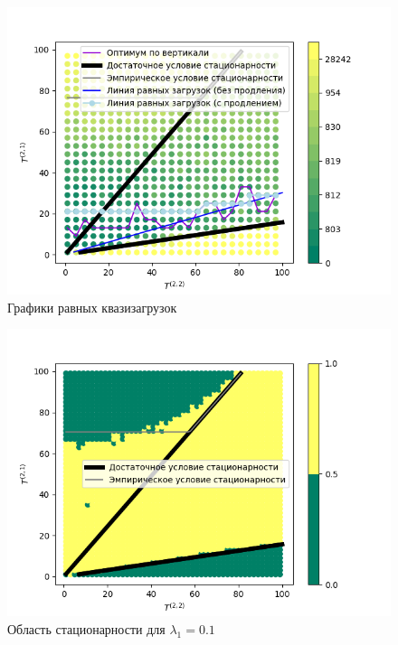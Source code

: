 \documentclass[11pt]{ubs}
\begin{document}
\begin{figure}[ht]
\centering
\includegraphics[scale=0.7]{0_1_thres_10_target.png} 
\caption{Графики равных квазизагрузок}
\label{Experiment:targets}
\end{figure}


\begin{figure}[ht]
    \includegraphics[scale=0.7]{0_1_thres_10_fact.png} 
\caption{Область стационарности для  $\lambda_1 = 0.1$}
\label{Experiment:intensities:one}
\end{figure}
\end{document}
